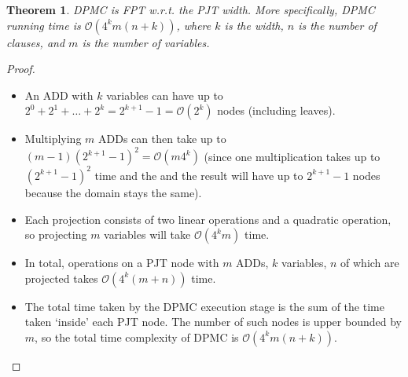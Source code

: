 \documentclass{article}
\newtheorem{theorem}{Theorem}
\theoremstyle{definition}
\theoremstyle{remark}
\begin{document}
\begin{theorem}
  \textsc{DPMC} is FPT w.r.t. the PJT width. More specifically,
  \textsc{DPMC} running time is $\mathcal{O}(4^km(n+k))$, where $k$ is the
  width, $n$ is the number of clauses, and $m$ is the number of variables.
\end{theorem}
\begin{proof} %
  \begin{itemize}
  \item An ADD with $k$ variables can have up to $2^0 + 2^1 + \dots + 2^k =
    2^{k+1} - 1 = \mathcal{O}(2^k)$ nodes (including leaves).
  \item Multiplying $m$ ADDs can then take up to $(m-1)(2^{k+1}-1)^2 =
    \mathcal{O}(m4^k)$ (since one multiplication takes up to $(2^{k+1}-1)^2$
    time and the and the result will have up to $2^{k+1} - 1$ nodes because the
    domain stays the same).
  \item Each projection consists of two linear operations and a quadratic
    operation, so projecting $m$ variables will take $\mathcal{O}(4^km)$ time.
  \item In total, operations on a PJT node with $m$ ADDs, $k$ variables, $n$ of
    which are projected takes $\mathcal{O}(4^k(m+n))$ time.
  \item The total time taken by the DPMC execution stage is the sum of the time
    taken `inside' each PJT node. The number of such nodes is upper bounded by
    $m$, so the total time complexity of DPMC is $\mathcal{O}(4^km(n+k))$.
  \end{itemize}
\end{proof}



\end{document}
